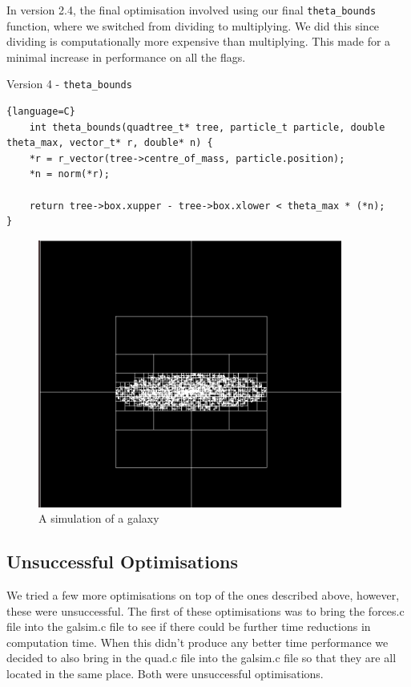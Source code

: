 In version 2.4, the final optimisation involved using our final \verb|theta_bounds| function, where we switched from dividing to multiplying. We did this since dividing is computationally more expensive than multiplying. This made for a minimal increase in performance on all the flags.
\begin{center}
    Version 4 - \verb|theta_bounds|
\end{center}
\begin{lstlisting}{language=C}
    int theta_bounds(quadtree_t* tree, particle_t particle, double theta_max, vector_t* r, double* n) {
    *r = r_vector(tree->centre_of_mass, particle.position);
    *n = norm(*r);

    return tree->box.xupper - tree->box.xlower < theta_max * (*n);
}
\end{lstlisting}
\begin{figure}[htb]
  \begin{center}
    \includegraphics[width = 10cm]{../images/squarespace.png}
    \caption{A simulation of a galaxy}
  \end{center}
\end{figure}

\newpage
\subsection{Unsuccessful Optimisations}
We tried a few more optimisations on top of the ones described above, however, these were unsuccessful. The first of these optimisations was to bring the forces.c file into the galsim.c file to see if there could be further time reductions in computation time. When this didn't produce any better time performance we decided to also bring in the quad.c file into the galsim.c file so that they are all located in the same place. Both were unsuccessful optimisations.
\newpage
